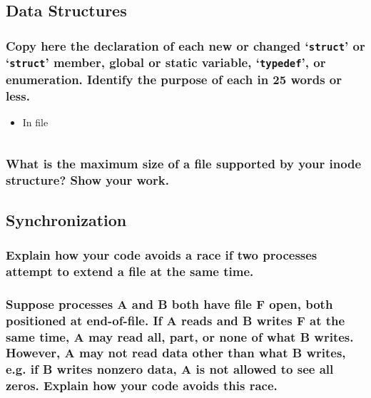 \documentclass[sigconf, nonacm, balance=false, urlbreakonhyphens=true]{acmart}
\begin{document}
        \label{Indexed and Extensible Files}
    
        \subsection{Data Structures}
        
            \subsubsection{Copy here the declaration of each new or changed `\texttt{struct}' or `\texttt{struct}' member, global or static variable, `\texttt{typedef}', or enumeration. Identify the purpose of each in 25 words or less. }
        
                \begin{itemize}
                    \item In file \texttt{}
\begin{verbatim}
\end{verbatim}
                \end{itemize}
            
            \subsubsection{What is the maximum size of a file supported by your inode structure?  Show your work. }
        
        \subsection{Synchronization}

            \subsubsection{Explain how your code avoids a race if two processes attempt to extend a file at the same time. }

            \subsubsection{Suppose processes A and B both have file F open, both positioned at end-of-file.  If A reads and B writes F at the same time, A may read all, part, or none of what B writes.  However, A may not read data other than what B writes, e.g. if B writes nonzero data, A is not allowed to see all zeros.  Explain how your code avoids this race. }
\end{document}
